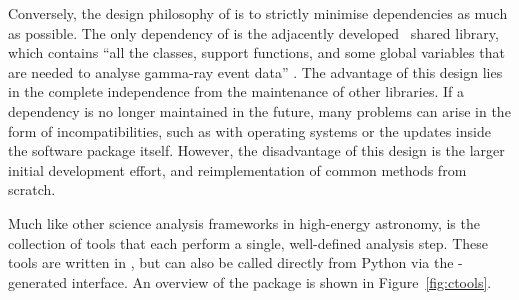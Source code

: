 \noindent Conversely, the design philosophy of  is to strictly minimise dependencies as much as possible. The only dependency of  is the adjacently developed  \cpp~shared library, which contains ``all the classes, support functions, and some global variables that are needed to analyse gamma-ray event data'' \cite[][p. 2]{Knodlseder2016}. The advantage of this design lies in the complete independence from the maintenance of other libraries. If a dependency is no longer maintained in the future, many problems can arise in the form of incompatibilities, such as with operating systems or the updates inside the software package itself. However, the disadvantage of this design is the larger initial development effort, and reimplementation of common methods from scratch.

Much like other science analysis frameworks in high-energy astronomy,  is the collection of tools that each perform a single, well-defined analysis step. These tools are written in \cpp, but can also be called directly from Python via the -generated interface. An overview of the  package is shown in Figure~\ref{fig:ctools}.

